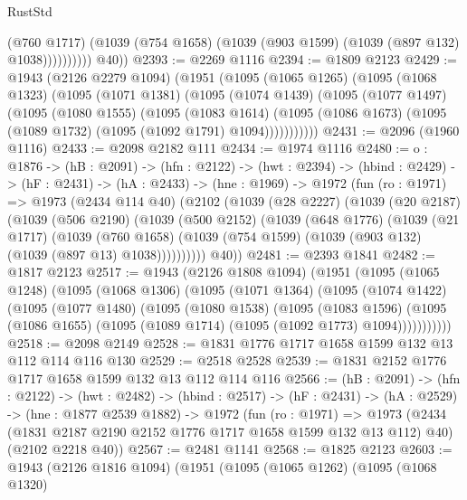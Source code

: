 \begin{lexlean}{RustStd}
\begin{coremodule}
                      (@760 @1717)
                      (@1039 (@754 @1658) (@1039 (@903 @1599) (@1039 (@897 @132) @1038))))))))))
        @40))
@2393 := @2269 @1116
@2394 := @1809 @2123
@2429 := @1943
    (@2126 @2279 @1094)
    (@1951
      (@1095
        (@1065 @1265)
        (@1095
          (@1068 @1323)
          (@1095
            (@1071 @1381)
            (@1095
              (@1074 @1439)
              (@1095
                (@1077 @1497)
                (@1095
                  (@1080 @1555)
                  (@1095
                    (@1083 @1614)
                    (@1095 (@1086 @1673) (@1095 (@1089 @1732) (@1095 (@1092 @1791) @1094)))))))))))
@2431 := @2096 (@1960 @1116)
@2433 := @2098 @2182 @111
@2434 := @1974 @1116
@2480 := {o : @1876} ->
  (hB : @2091) ->
  (hfn : @2122) ->
  (hwt : @2394) ->
  (hbind : @2429) ->
  (hF : @2431) ->
  (hA : @2433) ->
  (hne : @1969) ->
  @1972
    (fun (ro : @1971) =>
    @1973
      (@2434 @114 @40)
      (@2102
        (@1039
          (@28 @2227)
          (@1039
            (@20 @2187)
            (@1039
              (@506 @2190)
              (@1039
                (@500 @2152)
                (@1039
                  (@648 @1776)
                  (@1039
                    (@21 @1717)
                    (@1039
                      (@760 @1658)
                      (@1039 (@754 @1599) (@1039 (@903 @132) (@1039 (@897 @13) @1038))))))))))
        @40))
@2481 := @2393 @1841
@2482 := @1817 @2123
@2517 := @1943
    (@2126 @1808 @1094)
    (@1951
      (@1095
        (@1065 @1248)
        (@1095
          (@1068 @1306)
          (@1095
            (@1071 @1364)
            (@1095
              (@1074 @1422)
              (@1095
                (@1077 @1480)
                (@1095
                  (@1080 @1538)
                  (@1095
                    (@1083 @1596)
                    (@1095 (@1086 @1655) (@1095 (@1089 @1714) (@1095 (@1092 @1773) @1094)))))))))))
@2518 := @2098 @2149
@2528 := @1831 @1776 @1717 @1658 @1599 @132 @13 @112 @114 @116 @130
@2529 := @2518 @2528
@2539 := @1831 @2152 @1776 @1717 @1658 @1599 @132 @13 @112 @114 @116
@2566 := (hB : @2091) ->
  (hfn : @2122) ->
  (hwt : @2482) ->
  (hbind : @2517) ->
  (hF : @2431) ->
  (hA : @2529) ->
  (hne : @1877 @2539 @1882) ->
  @1972
    (fun (ro : @1971) =>
    @1973
      (@2434 (@1831 @2187 @2190 @2152 @1776 @1717 @1658 @1599 @132 @13 @112) @40)
      (@2102 @2218 @40))
@2567 := @2481 @1141
@2568 := @1825 @2123
@2603 := @1943
    (@2126 @1816 @1094)
    (@1951
      (@1095
        (@1065 @1262)
        (@1095
          (@1068 @1320)

\end{coremodule}
\end{lexlean}
